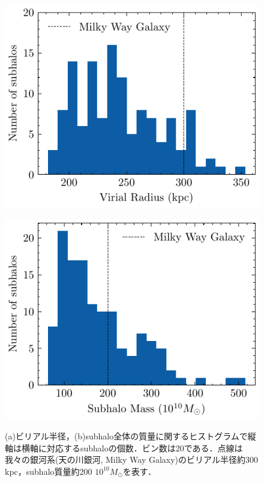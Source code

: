\begin{figure}[htbp]
	\centering
	\begin{minipage}[b]{0.45\linewidth}
		\centering
		\includegraphics[width=\linewidth]{pic/numsubhalo}
		\subcaption{}
		\label{fig:numsubhalo}
	\end{minipage}
	\begin{minipage}[b]{0.45\linewidth}
		\centering
		\includegraphics[width=\linewidth]{pic/EstimatedSubhaloMass}
		\subcaption{}
		\label{fig:estimatedsubhalomass}
	\end{minipage}
	\captionsetup{width=.9\linewidth}
	\caption{(a)ビリアル半径，(b)subhalo全体の質量に関するヒストグラムで縦軸は横軸に対応するsubhaloの個数．ビン数は20である．点線は我々の銀河系(天の川銀河, Milky Way Galaxy)のビリアル半径約300 kpc，subhalo質量約200 $10^{10}M_\odot$を表す．}
	\label{fig:distribution_of_VR_MASS}
\end{figure}

